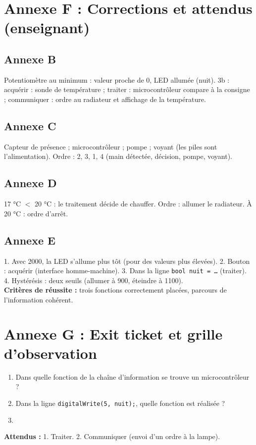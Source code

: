 \documentclass[11pt,a4paper]{article}
\begin{document}
\newpage
\section*{Annexe F : Corrections et attendus (enseignant)}

\subsection*{Annexe B}
Potentiomètre au minimum : valeur proche de 0, LED allumée (nuit). 3b : acquérir : sonde de température ; traiter : microcontrôleur compare à la consigne ; communiquer : ordre au radiateur et affichage de la température.

\subsection*{Annexe C}
Capteur de présence ; microcontrôleur ; pompe ; voyant (les piles sont l'alimentation). Ordre : 2, 3, 1, 4 (main détectée, décision, pompe, voyant).

\subsection*{Annexe D}
17 °C $<$ 20 °C : le traitement décide de chauffer. Ordre : allumer le radiateur. À 20 °C : ordre d'arrêt.

\subsection*{Annexe E}
1. Avec 2000, la LED s'allume plus tôt (pour des valeurs plus élevées). 2. Bouton : acquérir (interface homme-machine). 3. Dans la ligne \texttt{bool nuit = \ldots} (traiter). 4. Hystérésis : deux seuils (allumer à 900, éteindre à 1100).\\
\textbf{Critères de réussite :} trois fonctions correctement placées, parcours de l'information cohérent.

\newpage
\section*{Annexe G : Exit ticket et grille d'observation}

\begin{enumerate}
 \item Dans quelle fonction de la chaîne d'information se trouve un microcontrôleur ?\\ \lig
 \item Dans la ligne \texttt{digitalWrite(5, nuit);}, quelle fonction est réalisée ?\\ \lig
 \item \autoeval
\end{enumerate}
\textbf{Attendus :} 1. Traiter. 2. Communiquer (envoi d'un ordre à la lampe).

\bigskip
{}
\end{document}

